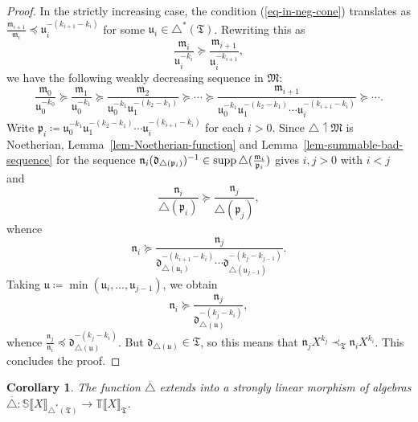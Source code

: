 \documentclass{article}
\newcommand{\assign}{\coloneqq}
\newcommand{\of}{:}
\newcommand{\tmop}[1]{\ensuremath{\operatorname{#1}}}
\newtheorem{corollary}[theorem]{Corollary}
\theoremstyle{remark}\newtheorem*{convention*}{Convention}
\begin{document}
\begin{proof}
  In the strictly increasing case, the condition (\ref{eq-in-neg-cone})
  translates as $\frac{\mathfrak{m}_{i + 1}}{\mathfrak{m}_i} \preccurlyeq
  \mathfrak{u}_i^{- (k_{i + 1} - k_i)}$ for some $\mathfrak{u}_i \in
  \triangle^{\ast} (\mathfrak{T})$. Rewriting this as
  \[ \frac{\mathfrak{m}_i}{\mathfrak{u}_i^{- k_i}} \succcurlyeq
     \frac{\mathfrak{m}_{i + 1}}{\mathfrak{u}_i^{- k_{i + 1}}}, \]
  we have the following weakly decreasing sequence in $\mathfrak{M}$:
  \[ \frac{\mathfrak{m}_0}{\mathfrak{u}_0^{- k_0}} \succcurlyeq
     \frac{\mathfrak{m}_1}{\mathfrak{u}_0^{- k_1}} \succcurlyeq
     \frac{\mathfrak{m}_2}{\mathfrak{u}_0^{- k_1} \mathfrak{u}_1^{- (k_2 -
     k_1)}} \succcurlyeq \cdots \succcurlyeq \frac{\mathfrak{m}_{i +
     1}}{\mathfrak{u}_0^{- k_1} \mathfrak{u}_1^{- (k_2 - k_1)} \cdots
     \mathfrak{u}_i^{- (k_{i + 1} - k_i)}} \succcurlyeq \cdots . \]
  Write $\mathfrak{p}_i \assign \mathfrak{u}_0^{- k_1} \mathfrak{u}_1^{- (k_2
  - k_1)} \cdots \mathfrak{u}_i^{- (k_{i + 1} - k_i)}$ for each $i > 0$. Since
  $\triangle \upharpoonleft \mathfrak{M}$ is Noetherian,
  Lemma~\ref{lem-Noetherian-function} and Lemma~\ref{lem-summable-bad-sequence} for the
  sequence $\mathfrak{n}_i  (\mathfrak{d}_{\smash{\triangle
  (\mathfrak{p}_i)}})^{- 1} \in \tmop{supp} \triangle
  (\frac{\mathfrak{m}_i}{\mathfrak{p}_i})$ gives $i, j > 0$ with $i < j$ and
  \[ \frac{\mathfrak{n}_i}{\triangle (\mathfrak{p}_i)} \succcurlyeq
     \frac{\mathfrak{n}_j}{\triangle (\mathfrak{p}_j)}, \]
  whence
  \[ \mathfrak{n}_i \succcurlyeq \frac{\mathfrak{n}_j}{\mathfrak{d}_{\triangle
     (\mathfrak{u}_i)}^{- (k_{i + 1} - k_i)} \cdots \mathfrak{d}_{\triangle
     (\mathfrak{u}_{j - 1})}^{- (k_j - k_{j - 1})}} . \]
  Taking $\mathfrak{u} \assign \min (\mathfrak{u}_i, \ldots, \mathfrak{u}_{j -
  1})$, we obtain
  \[ \mathfrak{n}_i \succcurlyeq \frac{\mathfrak{n}_j}{\mathfrak{d}_{\triangle
     (\mathfrak{u})}^{- (k_j - k_i)}}, \]
  whence $\frac{\mathfrak{n}_j}{\mathfrak{n}_i} \preccurlyeq
  \mathfrak{d}_{\triangle (\mathfrak{u})}^{- (k_j - k_i)}$. But
  $\mathfrak{d}_{\triangle (\mathfrak{u})} \in \mathfrak{T}$, so this means
  that $\mathfrak{n}_j X^{k_j} \prec_{\mathfrak{T}} \mathfrak{n}_i X^{k_i}$.
  This concludes the proof.
\end{proof}

\begin{corollary}
  \label{cor-cut-extension-morphism}The function $\overline{\triangle}$
  extends into a strongly linear morphism of algebras $\overline{\triangle}
  \of \mathbb{S} \llbracket X \rrbracket_{\triangle^{\ast} (\mathfrak{T})}
  \longrightarrow \mathbb{T} \llbracket X \rrbracket_{\mathfrak{T}}$.
\end{corollary}
\end{document}

